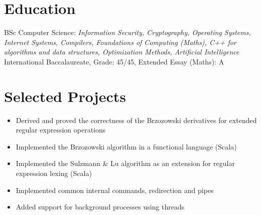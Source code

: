\documentclass{resume}
\begin{document}



\section{Education}
BSc Computer Science: \textit{Information Security, Cryptography, Operating Systems, Internet Systems, Compilers, Foundations of Computing (Maths),
C++ for algorithms and data structures, Optimization Methods, Artificial Intelligence}
International Baccalaureate, Grade: 45/45, Extended Essay (Maths): A


\section{Selected Projects}

\begin{itemize}
  \item Derived and proved the correctness of the Brzozowski derivatives for extended regular expression operations
  \item Implemented the Brzozowski algorithm in a functional language (Scala)
  \item Implemented the Sulzmann \& Lu algorithm as an extension for regular expression lexing (Scala)
\end{itemize}

\begin{itemize}
  \item Implemented common internal commands, redirection and pipes
  \item Added support for background processes using threads
\end{itemize}
\end{document}
